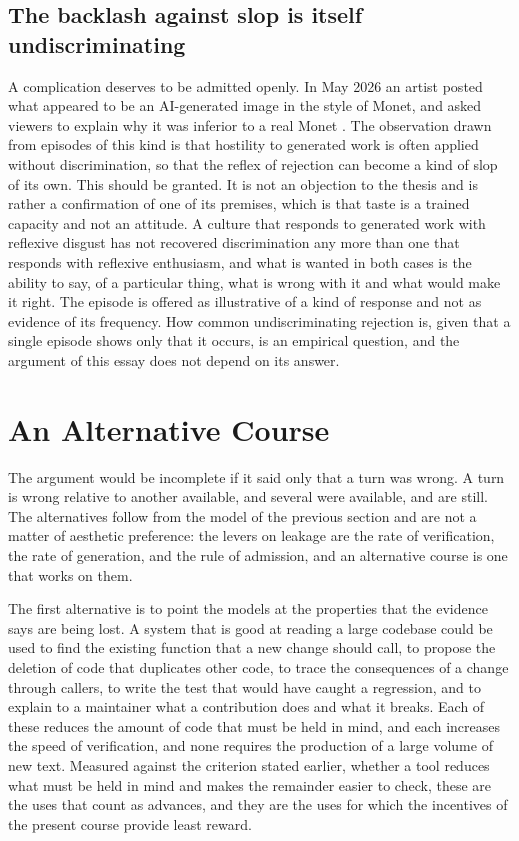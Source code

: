 \documentclass[11pt,a4paper]{article}
\theoremstyle{remark}
\begin{document}
\subsection{The backlash against slop is itself undiscriminating}

A complication deserves to be admitted openly. In May 2026 an artist posted what appeared to be an AI-generated image in the style of Monet, and asked viewers to explain why it was inferior to a real Monet \cite{ListenFirst2026}. The observation drawn from episodes of this kind is that hostility to generated work is often applied without discrimination, so that the reflex of rejection can become a kind of slop of its own. This should be granted. It is not an objection to the thesis and is rather a confirmation of one of its premises, which is that taste is a trained capacity and not an attitude. A culture that responds to generated work with reflexive disgust has not recovered discrimination any more than one that responds with reflexive enthusiasm, and what is wanted in both cases is the ability to say, of a particular thing, what is wrong with it and what would make it right. The episode is offered as illustrative of a kind of response and not as evidence of its frequency. How common undiscriminating rejection is, given that a single episode shows only that it occurs, is an empirical question, and the argument of this essay does not depend on its answer.

\section{An Alternative Course}

The argument would be incomplete if it said only that a turn was wrong. A turn is wrong relative to another available, and several were available, and are still. The alternatives follow from the model of the previous section and are not a matter of aesthetic preference: the levers on leakage are the rate of verification, the rate of generation, and the rule of admission, and an alternative course is one that works on them.

The first alternative is to point the models at the properties that the evidence says are being lost. A system that is good at reading a large codebase could be used to find the existing function that a new change should call, to propose the deletion of code that duplicates other code, to trace the consequences of a change through callers, to write the test that would have caught a regression, and to explain to a maintainer what a contribution does and what it breaks. Each of these reduces the amount of code that must be held in mind, and each increases the speed of verification, and none requires the production of a large volume of new text. Measured against the criterion stated earlier, whether a tool reduces what must be held in mind and makes the remainder easier to check, these are the uses that count as advances, and they are the uses for which the incentives of the present course provide least reward.
\end{document}
